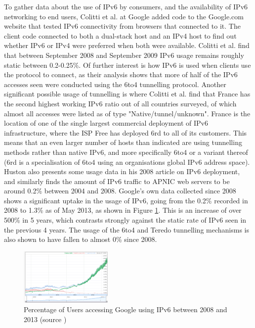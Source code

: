 To gather data about the use of IPv6 by consumers, and the availability of IPv6
networking to end users, Colitti et al. at Google added code to the Google.com
website that tested IPv6 connectivity from browsers that connected to it. The
client code connected to both a dual-stack host and an IPv4 host to find out
whether IPv6 or IPv4 were preferred when both were available\cite{colitti_evaluating_2010}. Colitti et al.
find that between September 2008 and September 2009 IPv6 usage remains roughly
static between 0.2-0.25\%. Of further interest is how IPv6 is used when clients
use the protocol to connect, as their analysis shows that more of half of the IPv6 accesses
seen were conducted using the 6to4 tunnelling protocol. Another significant
possible usage of tunnelling is where Colitti et al. find that France has the
second highest working IPv6 ratio out of all countries surveyed, of which
almost all accesses were listed as of type "Native/tunnel/unknown". France is
the location of one of the single largest commercial deployment of IPv6
infrastructure, where the ISP Free has deployed 6rd\cite{rfc5569} to all of its
customers. This means that an even larger number of hosts than indicated are
using tunnelling methods rather than native IPv6, and more specifically 6to4 or
a variant thereof (6rd is a specialisation of 6to4 using an organisations
global IPv6 address space). Huston also presents some usage data in his 2008
article on IPv6 deployment, and similarly finds the amount of IPv6 traffic to
APNIC web servers to be around 0.2\% between 2004 and 2008\cite{huston_ipv6_2008}. Google's own data
collected since 2008 shows a significant uptake in the usage of IPv6, going from
the 0.2\% recorded in 2008 to 1.3\% as of May 2013, as shown in Figure
\ref{fig:google-access}. This is an increase of over
500\% in 5 years, which contrasts strongly against the static rate of IPv6 seen
in the previous 4 years. The usage of the 6to4 and Teredo tunnelling mechanisms
is also shown to have fallen to almost 0\% since 2008.

\begin{figure}[htb]
\centering
\includegraphics[width=0.4\textwidth]{img/v6-google-access.png}
\caption{Percentage of Users accessing Google using IPv6 between 2008 and 2013
(source \protect\cite{google_inc._statistics:_2013})}
\label{fig:google-access}
\end{figure}

